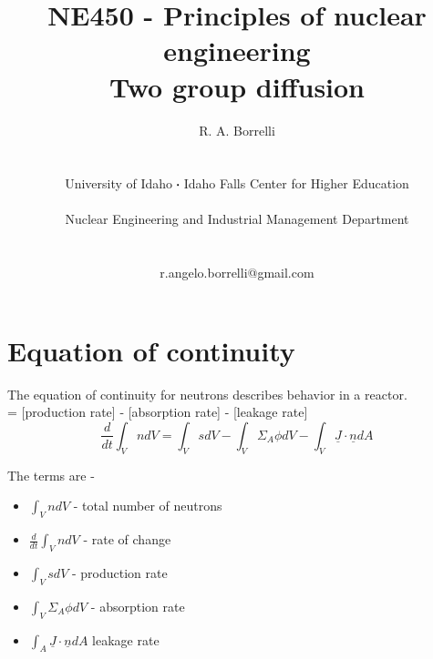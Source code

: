 \documentclass[11pt,a4paper]{article}
\newcommand*\sq{\mathbin{\vcenter{\hbox{\rule{.3ex}{.3ex}}}}} %
\begin{document}
\begin{titlepage}
    \title{
        NE450 - Principles of nuclear engineering\\
        Two group diffusion\\
    }
    \author{
        R. A. Borrelli
        \\ \\ \\
        University of Idaho $\sq$ Idaho Falls Center for Higher Education
        \\ \\
        Nuclear Engineering and Industrial Management Department
        \\ \\ \\
        r.angelo.borrelli@gmail.com
    }
\clearpage %
\maketitle
\thispagestyle{empty} %
\end{titlepage}

\section{Equation of continuity}
\noindent The equation of continuity for neutrons describes behavior in a reactor.\\

 = [production rate] - [absorption rate] - [leakage rate]\\

\begin{equation} \label{eq-1-continuity}
    \frac{d}{dt}\int_V ndV=\int_V sdV-\int_V\Sigma_A\phi dV-\int_V\underline{J}\cdot\underline{n}dA
\end{equation}

\noindent The terms are - 
\begin{itemize}[leftmargin=*,topsep=0pt]
    \item $\int_V ndV$ - total number of neutrons
    \item $\frac{d}{dt} \int_V ndV$ - rate of change
    \item $\int_V sdV$ - production rate
    \item $\int_V \Sigma_A \phi dV$ - absorption rate
    \item $\int_A \underline{J} \cdot \underline{n} dA$ leakage rate
\end{itemize}
\vspace{\baselineskip}
\end{document}
